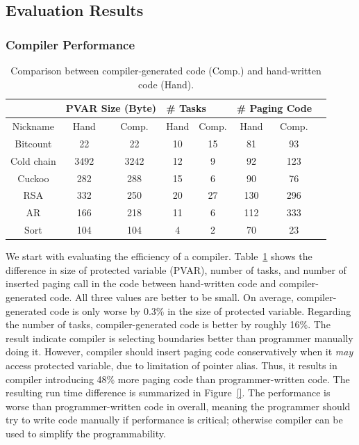 \subsection{Evaluation Results}
\label{sec:results_evaluation}

\subsubsection{Compiler Performance}
\label{sec:results_compiler}

\begin{table}[t]
	\centering
	\footnotesize
	\begin{tabular}{|c|c|c|c|c|c|c|c|}
		\hline
		{} & \multicolumn{2}{l|}{{PVAR Size (Byte)}} & \multicolumn{2}{l|}{{\# Tasks}} & \multicolumn{2}{l|}{{\# Paging Code}} \\
		\hline
		Nickname & Hand & Comp. & Hand & Comp. & Hand & Comp.\\
		\hline\hline
		Bitcount & 22 & 22 & 10 & 15 & 81 & 93 \\
		Cold chain & 3492 & 3242 & 12 & 9 & 92 & 123\\
		Cuckoo & 282 & 288 & 15 & 6 & 90 & 76\\
		RSA & 332 & 250 & 20 & 27 & 130 & 296\\
		AR & 166 & 218 & 11 & 6 & 112 & 333\\
		Sort & 104 & 104 & 4 & 2 & 70 & 23\\
		\hline
	\end{tabular}
	\caption{Comparison between compiler-generated code (Comp.) and hand-written \sys code (Hand).}
\label{table:compiler_result}
\end{table}

We start with evaluating the efficiency of a \sys compiler. Table~\ref{table:compiler_result} shows
the difference in size of protected variable (PVAR), number of tasks, and number of inserted paging call in the code between hand-written \sys code
and compiler-generated \sys code. All three values are better to be small. On average, compiler-generated
code is only worse by 0.3\% in the size of protected variable. Regarding the number of tasks, compiler-generated code
is better by roughly 16\%. The result indicate compiler is selecting boundaries better than programmer manually doing it.
However, compiler should insert paging code conservatively when it {\em may} access protected variable, due to limitation of
pointer alias. Thus, it results in compiler introducing 48\% more paging code than programmer-written code. The resulting run time
difference is summarized in Figure~\ref{}. The performance is worse than programmer-written \sys code
in overall, meaning the programmer should try to write code manually if performance is critical; otherwise compiler can be
used to simplify the programmability.

